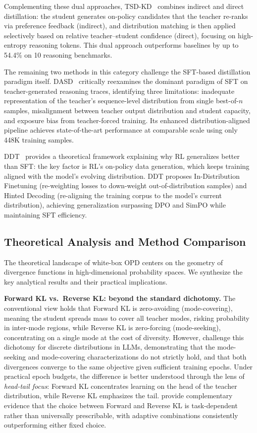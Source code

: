 \documentclass{article} %
\begin{document}
Complementing these dual approaches, TSD-KD~\citep{2603.13260} combines indirect and direct distillation: the student generates on-policy candidates that the teacher re-ranks via preference feedback (indirect), and distribution matching is then applied selectively based on relative teacher--student confidence (direct), focusing on high-entropy reasoning tokens. This dual approach outperforms baselines by up to 54.4\% on 10 reasoning benchmarks.

The remaining two methods in this category challenge the SFT-based distillation paradigm itself. DASD~\citep{2601.09088} critically reexamines the dominant paradigm of SFT on teacher-generated reasoning traces, identifying three limitations: inadequate representation of the teacher's sequence-level distribution from single best-of-$n$ samples, misalignment between teacher output distribution and student capacity, and exposure bias from teacher-forced training. Its enhanced distribution-aligned pipeline achieves state-of-the-art performance at comparable scale using only 448K training samples.

DDT~\citep{2602.12222} provides a theoretical framework explaining why RL generalizes better than SFT: the key factor is RL's on-policy data generation, which keeps training aligned with the model's evolving distribution. DDT proposes In-Distribution Finetuning (re-weighting losses to down-weight out-of-distribution samples) and Hinted Decoding (re-aligning the training corpus to the model's current distribution), achieving generalization surpassing DPO and SimPO while maintaining SFT efficiency.


\subsection{Theoretical Analysis and Method Comparison}
\label{subsec:theory_whitebox}

The theoretical landscape of white-box OPD centers on the geometry of divergence functions in high-dimensional probability spaces. We synthesize the key analytical results and their practical implications.

\textbf{Forward KL vs.\ Reverse KL: beyond the standard dichotomy.}
The conventional view holds that Forward KL is zero-avoiding (mode-covering), meaning the student spreads mass to cover all teacher modes, risking probability in inter-mode regions, while Reverse KL is zero-forcing (mode-seeking), concentrating on a single mode at the cost of diversity. However, \citet{2404.02657} challenge this dichotomy for discrete distributions in LLMs, demonstrating that the mode-seeking and mode-covering characterizations do not strictly hold, and that both divergences converge to the same objective given sufficient training epochs. Under practical epoch budgets, the difference is better understood through the lens of \emph{head-tail focus}: Forward KL concentrates learning on the head of the teacher distribution, while Reverse KL emphasizes the tail. \citet{2402.11890} provide complementary evidence that the choice between Forward and Reverse KL is task-dependent rather than universally prescribable, with adaptive combinations consistently outperforming either fixed choice.
\end{document}
